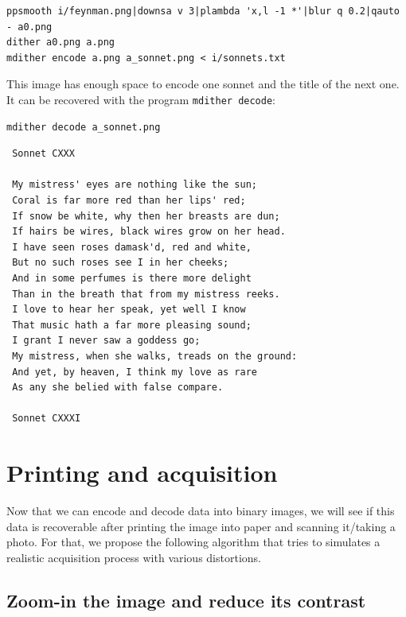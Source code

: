 \begin{verbatim}
ppsmooth i/feynman.png|downsa v 3|plambda 'x,l -1 *'|blur q 0.2|qauto - a0.png
dither a0.png a.png
mdither encode a.png a_sonnet.png < i/sonnets.txt
\end{verbatim}

This image has enough space to encode one sonnet and the title of
the next one.  It can be
recovered with the program \verb+mdither decode+:

 \begin{verbatim}
mdither decode a_sonnet.png
\end{verbatim} %

 \begin{verbatim}
 Sonnet CXXX

 My mistress' eyes are nothing like the sun;
 Coral is far more red than her lips' red;
 If snow be white, why then her breasts are dun;
 If hairs be wires, black wires grow on her head.
 I have seen roses damask'd, red and white,
 But no such roses see I in her cheeks;
 And in some perfumes is there more delight
 Than in the breath that from my mistress reeks.
 I love to hear her speak, yet well I know
 That music hath a far more pleasing sound;
 I grant I never saw a goddess go;
 My mistress, when she walks, treads on the ground:
 And yet, by heaven, I think my love as rare
 As any she belied with false compare.

 Sonnet CXXXI

\end{verbatim} %


\section{Printing and acquisition}

Now that we can encode and decode data into binary images, we will see if
this data is recoverable after printing the image into paper and scanning
it/taking a photo.  For that, we propose the following algorithm that tries
to simulates a realistic acquisition process with various distortions.

\subsection{Zoom-in the image and reduce its contrast}

